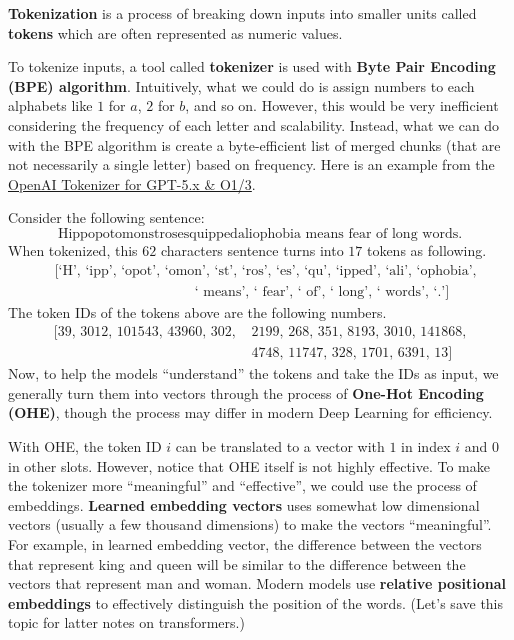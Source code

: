 \documentclass[../../../main.tex]{subfiles}
\begin{document}
\begin{definition}{}{}
\textbf{Tokenization} is a process of breaking down inputs
into smaller units called \textbf{tokens} which are often
represented as numeric values.
\end{definition}

To tokenize inputs, a tool called \textbf{tokenizer} is
used with \textbf{Byte Pair Encoding (BPE) algorithm}.
Intuitively, what we could do is assign numbers to each
alphabets like $1$ for $a$, $2$ for $b$, and so on. However,
this would be very inefficient considering the frequency of
each letter and scalability. Instead, what we can do with
the BPE algorithm is create a byte-efficient list of
merged chunks (that are not necessarily a single letter)
based on frequency. Here is an example from the
\href{https://platform.openai.com/tokenizer}{OpenAI Tokenizer
for GPT-5.x \& O1/3}.

Consider the following sentence:
\[
\text{Hippopotomonstrosesquippedaliophobia means fear of long words.}
\]
When tokenized, this $62$ characters sentence turns into $17$
tokens as following.
\begin{align*}
    &\text{[`H', `ipp', `opot', `omon', `st', `ros', `es', `qu',
            `ipped', `ali', `ophobia',} \\
    &\qquad\qquad\qquad\qquad\qquad
    \text{` means', ` fear', ` of', ` long',
          ` words', `.']}
\end{align*}
The token IDs of the tokens above are the following numbers.
\begin{align*}
    \text{[39, 3012, 101543, 43960, 302, }
    &\text{2199, 268, 351, 8193, 3010, 141868,} \\
    &\text{4748, 11747, 328, 1701, 6391, 13]}
\end{align*}
Now, to help the models ``understand'' the tokens and take
the IDs as input, we generally turn them into vectors through
the process of \textbf{One-Hot Encoding (OHE)}, though the process
may differ in modern Deep Learning for efficiency.

With OHE, the token ID $i$ can be translated to a vector with
$1$ in index $i$ and $0$ in other slots. However, notice that
OHE itself is not highly effective. To make the tokenizer
more ``meaningful'' and ``effective'', we could use the process
of embeddings. \textbf{Learned embedding vectors} uses somewhat
low dimensional vectors (usually a few thousand dimensions) to
make the vectors ``meaningful''. For example, in learned
embedding vector, the difference between the vectors that
represent king and queen will be similar to the difference
between the vectors that represent man and woman. Modern models
use \textbf{relative positional embeddings} to effectively
distinguish the position of the words. (Let's save this topic
for latter notes on transformers.)
\end{document}

